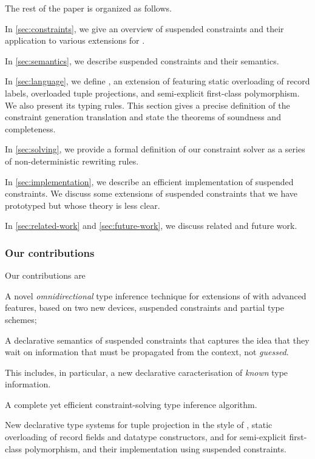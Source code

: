 \documentclass[acmsmall,screen,nonacm]{acmart}
\begin{document}
The rest of the paper is organized as follows.
\begin{enumerate*}[label={}]
\item
  In \cref{sec:constraints}, we give an overview of suspended constraints
  and their application to various extensions for \ML.
\item
  In \cref{sec:semantics}, we describe suspended constraints and their semantics.
\item
  In \cref{sec:language}, we define \OML, an extension of \ML featuring static
  overloading of record labels, overloaded tuple projections, and
  semi-explicit first-class polymorphism. We also present its typing rules.
  This section gives a precise definition of the constraint generation
  translation and state the theorems of soundness and completeness.
\item
  In \cref{sec:solving}, we provide a formal definition of our constraint
  solver as a series of non-deterministic rewriting rules.
\item In \cref{sec:implementation}, we describe an efficient implementation
  of suspended constraints. We discuss some extensions of suspended
  constraints that we have prototyped but whose theory is less clear.
\item
  In \cref{sec:related-work} and \cref{sec:future-work}, we discuss related
  and future work.
\end{enumerate*}

\subsubsection* {Our contributions}

Our contributions are
\begin{enumerate*}
\item
  A novel \emph{omnidirectional} type inference technique for
  extensions of \ML with advanced features, based on two new devices,
  suspended constraints and partial type schemes;

\item A declarative semantics of suspended constraints that captures the
  idea that they wait on information that must be propagated from the
  context, not \emph{guessed}.

  This includes, in particular, a new declarative caracterisation of
  \emph{known} type information.

\item
  A complete yet efficient constraint-solving type inference algorithm.

\item New declarative type systems for tuple projection in the style of \SML,
    static overloading of record fields and datatype constructors, and for
    semi-explicit first-class polymorphism, and their implementation using
    suspended constraints.

\end{enumerate*}
\end{document}

